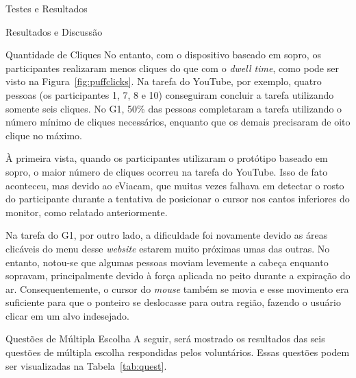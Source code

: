 \begin{chapter}{Testes e Resultados}
\begin{section}{Resultados e Discussão}
\begin{subsection}{Quantidade de Cliques}
No entanto, com o dispositivo baseado em sopro, os participantes realizaram
menos cliques do que com o \textit{dwell time}, como pode ser visto na
Figura~\ref{fig:puffclicks}. Na tarefa do YouTube, por exemplo, quatro pessoas
(os participantes 1, 7, 8 e 10) conseguiram concluir a tarefa utilizando somente
seis cliques. No G1, 50\% das pessoas completaram a tarefa utilizando o número
mínimo de cliques necessários, enquanto que os demais precisaram de oito clique
no máximo.

À primeira vista, quando os participantes utilizaram o protótipo baseado em
sopro, o maior número de cliques ocorreu na tarefa do YouTube. Isso de fato
aconteceu, mas devido ao eViacam, que muitas vezes falhava em detectar o rosto
do participante durante a tentativa de posicionar o cursor nos cantos inferiores
do monitor, como relatado anteriormente.
  
Na tarefa do G1, por outro lado, a dificuldade foi novamente devido as áreas
clicáveis do menu desse \textit{website} estarem muito próximas umas das
outras. No entanto, notou-se que algumas pessoas moviam levemente a cabeça
enquanto sopravam, principalmente devido à força aplicada no peito durante a
expiração do ar. Consequentemente, o cursor do \textit{mouse} também se movia e
esse movimento era suficiente para que o ponteiro se deslocasse para outra
região, fazendo o usuário clicar em um alvo indesejado.
\end{subsection}

\begin{subsection}{Questões de Múltipla Escolha}
A seguir, será mostrado os resultados das seis questões de múltipla escolha 
respondidas pelos voluntários. Essas questões podem ser visualizadas na
Tabela~\ref{tab:quest}.


\end{subsection}
\end{section}
\end{chapter}

